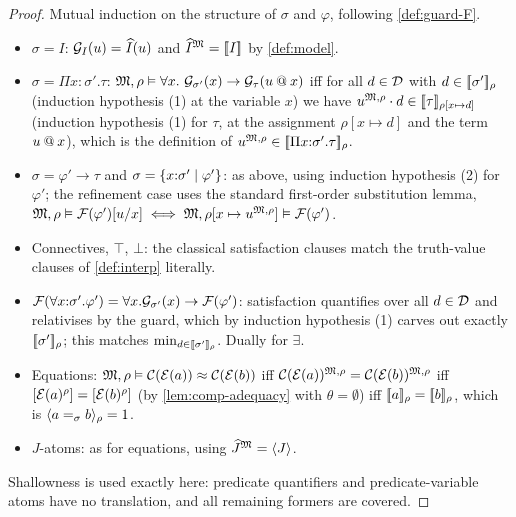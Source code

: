 \begin{proof}
Mutual induction on the structure of $\sigma$ and $\varphi$, following
\cref{def:guard-F}.
\begin{itemize}[leftmargin=2em]
\item $\sigma = I$: $\mathcal{G}_{I}(u) = \widehat{I}(u)$ and $\widehat{I}^{\mathfrak{M}} =
  [\![ I ]\!]_{}$ by \cref{def:model}.
\item $\sigma = \Pi x{:}\sigma'.\tau$: $\mathfrak{M}, \rho \vDash \forall x.\
  \mathcal{G}_{\sigma'}(x) \to \mathcal{G}_{\tau}(u \mathbin{@} x)$ iff for all $d \in
  \mathcal{D}$ with $d \in [\![ \sigma' ]\!]_{\rho}$ (induction hypothesis (1) at the
  variable $x$) we have $u^{\mathfrak{M},\rho} \cdot d \in [\![ \tau ]\!]_{\rho[x
  \mapsto d]}$ (induction hypothesis (1) for $\tau$, at the assignment
  $\rho[x \mapsto d]$ and the term $u \mathbin{@} x$), which is the definition
  of $u^{\mathfrak{M},\rho} \in [\![ \Pi x{:}\sigma'.\tau ]\!]_{\rho}$.
\item $\sigma = \varphi' \to \tau$ and $\sigma =
  \{x{:}\sigma' \mid \varphi'\}$: as above, using induction hypothesis
  (2) for $\varphi'$; the refinement case uses the standard first-order
  substitution lemma, $\mathfrak{M}, \rho \vDash
  \mathcal{F}(\varphi')[u/x] \iff \mathfrak{M}, \rho[x \mapsto u^{\mathfrak{M},\rho}]
  \vDash \mathcal{F}(\varphi')$.
\item Connectives, $\top$, $\bot$: the classical satisfaction clauses
  match the truth-value clauses of \cref{def:interp} literally.
\item $\mathcal{F}(\forall x{:}\sigma'.\varphi') = \forall x.\mathcal{G}_{\sigma'}(x)
  \to \mathcal{F}(\varphi')$: satisfaction quantifies over all $d \in \mathcal{D}$ and
  relativises by the guard, which by induction hypothesis (1) carves out
  exactly $[\![ \sigma' ]\!]_{\rho}$; this matches
  $\min_{d \in [\![ \sigma' ]\!]_{\rho}}$.  Dually for $\exists$.
\item Equations: $\mathfrak{M}, \rho \vDash \mathcal{C}(\mathcal{E}(a)) \approx
  \mathcal{C}(\mathcal{E}(b))$ iff $\mathcal{C}(\mathcal{E}(a))^{\mathfrak{M},\rho} =
  \mathcal{C}(\mathcal{E}(b))^{\mathfrak{M},\rho}$ iff $[\mathcal{E}(a)^\rho] =
  [\mathcal{E}(b)^\rho]$ (by \cref{lem:comp-adequacy} with $\theta =
  \emptyset$) iff $[\![ a ]\!]_\rho = [\![ b ]\!]_\rho$, which is
  $\langle a =_\sigma b \rangle_{\rho} = 1$.
\item $J$-atoms: as for equations, using $\widehat{J}^{\mathfrak{M}} = \langle J \rangle$.
\end{itemize}
Shallowness is used exactly here: predicate quantifiers and
predicate-variable atoms have no translation, and all remaining formers
are covered.
\end{proof}
